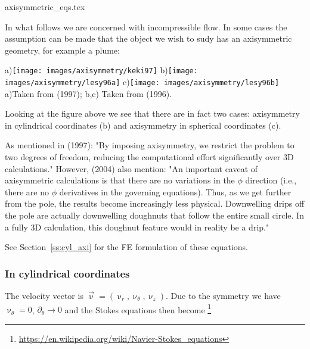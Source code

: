 \begin{flushright} {\tiny {\color{gray} axisymmetric\_eqs.tex}} \end{flushright}

In what follows we are concerned with incompressible flow.
In some cases the assumption can be made that the object we wish to sudy has an 
axisymmetric geometry, for example a plume:

\begin{center}
a)\texttt{[image: images/axisymmetry/keki97]}
b)\texttt{[image: images/axisymmetry/lesy96a]}
c)\texttt{[image: images/axisymmetry/lesy96b]}\\
{\captionfont a)Taken from \textcite{keki97} (1997); 
b,c) Taken from \textcite{lesy96} (1996).}
\end{center}

Looking at the figure above we see that there are in fact two cases: axisymmetry in 
cylindrical coordinates (b) and axisymmetry in spherical coordinates (c).

As mentioned in \textcite{keki97} (1997): "By imposing axisymmetry,
we restrict the problem to two degrees of freedom, reducing the computational
effort significantly over 3D calculations."
However, \cite{reki04} (2004) also mention:
"An important caveat of axisymmetric calculations is that there are no variations 
in the $\phi$ direction (i.e., there are no $\phi$ derivatives in
the governing equations). Thus, as we get further from
the pole, the results become increasingly less physical.
Downwelling drips off the pole are actually downwelling
doughnuts that follow the entire small circle. In a fully
3D calculation, this doughnut feature would in reality be a drip."


See Section~\ref{ss:cyl_axi} for the FE formulation of these equations.

\subsubsection{In cylindrical coordinates}

The velocity vector is $\vec{\upnu}=(\upnu_r,\upnu_\theta,\upnu_z)$. 
Due to the symmetry we have $\upnu_\theta=0$, $\partial_\theta \rightarrow 0$ 
and the Stokes equations 
then become \footnote{\url{https://en.wikipedia.org/wiki/Navier-Stokes_equations}}

